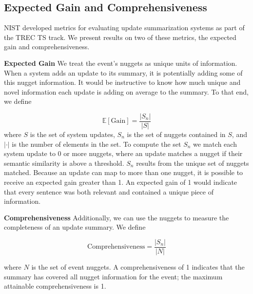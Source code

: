 \subsection{Expected Gain and Comprehensiveness}

NIST developed metrics for evaluating update summarization systems
as part of the TREC TS track.
We present results on two of these metrics, the expected gain and 
comprehensiveness.

\textbf{Expected Gain } We treat the event's nuggets as unique units of 
information.
When a system adds an update to its summary, it is potentially adding some
of this nugget information. It would be instructive to know how much unique
and novel information each update is adding on average to the summary.
To that end, we define

\[ \mathrm{\mathbb{E}[Gain]} = \frac{|S_n|}{|S|}%
\] 
where $S$ is the set of system updates, 
$S_n$ is the set of nuggets contained in $S$, and $|\cdot|$ is the number of
elements in the set.
To compute the set $S_n$ we match each system update to 0 or more nuggets, 
where an update matches a nugget if their semantic similarity is above 
a threshold. $S_n$ results from the unique set of nuggets matched.
Because an update can map to more than one nugget, it is possible to receive an
expected gain greater than 1.
An expected gain of 1 would indicate that every
sentence was both relevant and contained a unique piece of information.



\textbf{Comprehensiveness } Additionally, we can use the nuggets to measure the completeness of an update 
summary. We define

\[ \mathrm{Comprehensiveness} = \frac{|S_n|}{|N|}\]

where $N$ is the set of event nuggets.
A comprehensiveness of 1 indicates that the summary has covered
all nugget information for the event; the maximum
attainable comprehensiveness is 1.

